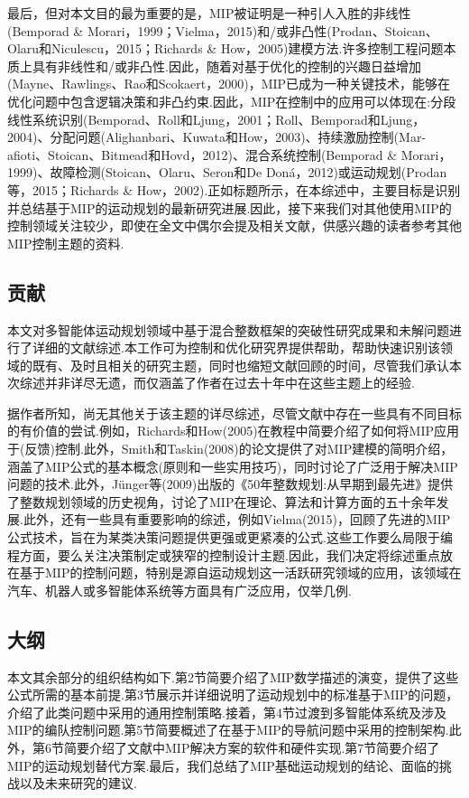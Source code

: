 \documentclass[10pt]{article}
\begin{document}
最后，但对本文目的最为重要的是，MIP被证明是一种引人入胜的非线性(Bemporad \& Morari，1999；Vielma，2015)和/或非凸性(Prodan、Stoican、Olaru和Niculescu，2015；Richards \& How，2005)建模方法.许多控制工程问题本质上具有非线性和/或非凸性.因此，随着对基于优化的控制的兴趣日益增加(Mayne、Rawlings、Rao和Scokaert，2000)，MIP已成为一种关键技术，能够在优化问题中包含逻辑决策和非凸约束.因此，MIP在控制中的应用可以体现在:分段线性系统识别(Bemporad、Roll和Ljung，2001；Roll、Bemporad和Ljung，2004)、分配问题(Alighanbari、Kuwata和How，2003)、持续激励控制(Mar-afioti、Stoican、Bitmead和Hovd，2012)、混合系统控制(Bemporad \& Morari，1999)、故障检测(Stoican、Olaru、Seron和De Doná，2012)或运动规划(Prodan等，2015；Richards \& How，2002).正如标题所示，在本综述中，主要目标是识别并总结基于MIP的运动规划的最新研究进展.因此，接下来我们对其他使用MIP的控制领域关注较少，即使在全文中偶尔会提及相关文献，供感兴趣的读者参考其他MIP控制主题的资料.

\subsection{贡献}

本文对多智能体运动规划领域中基于混合整数框架的突破性研究成果和未解问题进行了详细的文献综述.本工作可为控制和优化研究界提供帮助，帮助快速识别该领域的既有、及时且相关的研究主题，同时也缩短文献回顾的时间，尽管我们承认本次综述并非详尽无遗，而仅涵盖了作者在过去十年中在这些主题上的经验.

据作者所知，尚无其他关于该主题的详尽综述，尽管文献中存在一些具有不同目标的有价值的尝试.例如，Richards和How(2005)在教程中简要介绍了如何将MIP应用于(反馈)控制.此外，Smith和Taskin(2008)的论文提供了对MIP建模的简明介绍，涵盖了MIP公式的基本概念(原则和一些实用技巧)，同时讨论了广泛用于解决MIP问题的技术.此外，Jünger等(2009)出版的《50年整数规划:从早期到最先进》提供了整数规划领域的历史视角，讨论了MIP在理论、算法和计算方面的五十余年发展.此外，还有一些具有重要影响的综述，例如Vielma(2015)，回顾了先进的MIP公式技术，旨在为某类决策问题提供更强或更紧凑的公式.这些工作要么局限于编程方面，要么关注决策制定或狭窄的控制设计主题.因此，我们决定将综述重点放在基于MIP的控制问题，特别是源自运动规划这一活跃研究领域的应用，该领域在汽车、机器人或多智能体系统等方面具有广泛应用，仅举几例.

\subsection{大纲}

本文其余部分的组织结构如下.第2节简要介绍了MIP数学描述的演变，提供了这些公式所需的基本前提.第3节展示并详细说明了运动规划中的标准基于MIP的问题，介绍了此类问题中采用的通用控制策略.接着，第4节过渡到多智能体系统及涉及MIP的编队控制问题.第5节简要概述了在基于MIP的导航问题中采用的控制架构.此外，第6节简要介绍了文献中MIP解决方案的软件和硬件实现.第7节简要介绍了MIP的运动规划替代方案.最后，我们总结了MIP基础运动规划的结论、面临的挑战以及未来研究的建议.
\end{document}

